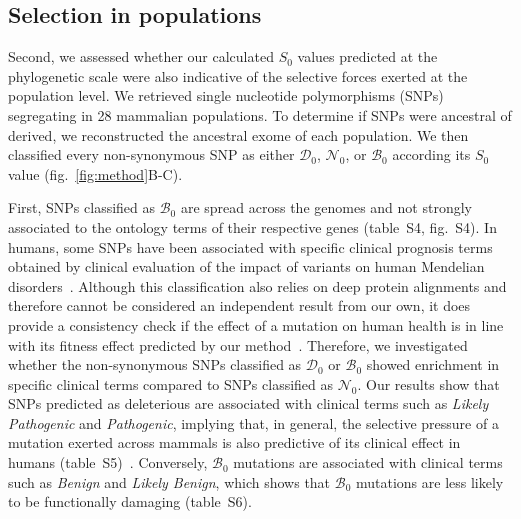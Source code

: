 \documentclass{article}
\newcommand{\Sphy}{S_{0}}
\newcommand{\SphyDel}{\mathcal{D}_0}
\newcommand{\SphyNeu}{\mathcal{N}_0}
\newcommand{\SphyBen}{\mathcal{B}_0}
\begin{document}
    \subsection*{Selection in populations}
    Second, we assessed whether our calculated $\Sphy$ values predicted at the phylogenetic scale were also indicative of the selective forces exerted at the population level.
    We retrieved single nucleotide polymorphisms (SNPs) segregating in 28 mammalian populations.
    To determine if SNPs were ancestral of derived, we reconstructed the ancestral exome of each population.
    We then classified every non-synonymous SNP as either $\SphyDel$, $\SphyNeu$, or $\SphyBen$ according its $\Sphy$ value (fig.~\ref{fig:method}B-C).

    First, SNPs classified as $\SphyBen$ are spread across the genomes and not strongly associated to the ontology terms of their respective genes (table~S4, fig.~S4).
    In humans, some SNPs have been associated with specific clinical prognosis terms obtained by clinical evaluation of the impact of variants on human Mendelian disorders~\cite{landrum_clinvar_2018}.
    Although this classification also relies on deep protein alignments and therefore cannot be considered an independent result from our own, it does provide a consistency check if the effect of a mutation on human health is in line with its fitness effect predicted by our method~\cite{grimm_evaluation_2015}.
    Therefore, we investigated whether the non-synonymous SNPs classified as $\SphyDel$ or $\SphyBen$ showed enrichment in specific clinical terms compared to SNPs classified as $\SphyNeu$.
    Our results show that SNPs predicted as deleterious are associated with clinical terms such as \textit{Likely Pathogenic} and \textit{Pathogenic}, implying that, in general, the selective pressure of a mutation exerted across mammals is also predictive of its clinical effect in humans (table~S5)~\cite{sullivan_leveraging_2023}.
    Conversely, $\SphyBen$ mutations are associated with clinical terms such as \textit{Benign} and \textit{Likely Benign}, which shows that $\SphyBen$ mutations are less likely to be functionally damaging (table~S6).
\end{document}
